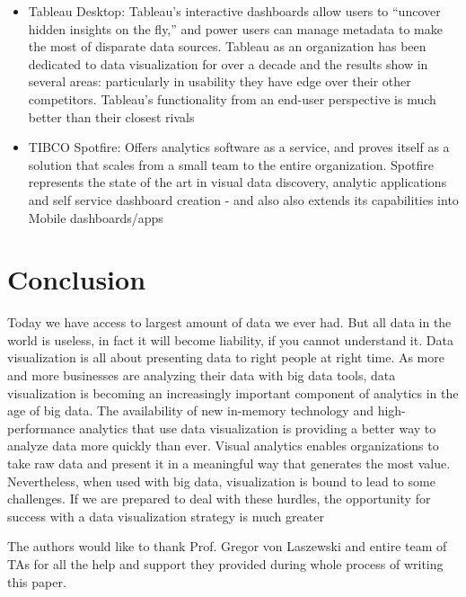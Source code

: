 \documentclass[sigconf]{acmart}
\begin{document}
\begin{itemize}
\item Tableau Desktop: Tableau’s interactive dashboards allow users to ``uncover hidden insights on the fly,'' and power users can manage metadata to make the most of disparate data sources.  Tableau as an organization has been dedicated to data visualization for over a decade and the results show in several areas: particularly in usability they have edge over their other competitors. Tableau’s functionality from an end-user perspective is much better than their closest rivals

\item TIBCO Spotfire: Offers analytics software as a service, and proves itself as a solution that scales from a small team to the entire organization. Spotfire represents the state of the art in visual data discovery, analytic applications and self service dashboard creation - and also also extends its capabilities into Mobile dashboards/apps
\end{itemize}\cite{sept1006}

\section{Conclusion}

 Today we have access to largest amount of data we ever had. But all data in the world is useless, in fact it will become liability, if you cannot understand it. Data visualization is all about presenting data to right people at right time.  As more and more businesses are analyzing their data with big data tools, data visualization is becoming an increasingly important component of analytics in the age of big data. The availability of new in-memory technology and high-performance analytics that use data visualization is providing a better way to analyze data more quickly than ever. Visual analytics enables organizations to take raw data and present it in a meaningful way that generates the most value. Nevertheless, when used with big data, visualization is bound to lead to some challenges. If we are prepared to deal with these hurdles, the opportunity for success with a data visualization strategy is much greater\cite{sept1005} 

\begin{acks}

  The authors would like to thank Prof. Gregor von Laszewski and entire team of TAs for all the help and support they provided during whole process of writing this paper.

\end{acks}




 


\end{document}
